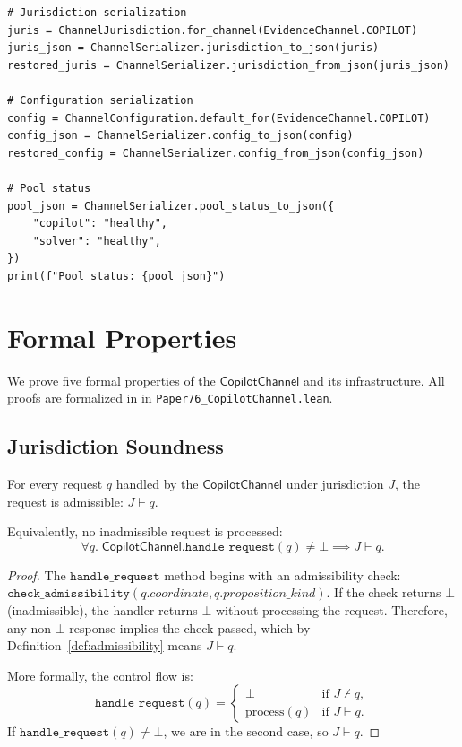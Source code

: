 \documentclass[11pt]{article}
\newcommand{\CopChan}{\mathsf{CopilotChannel}}
\newcommand{\CopHandle}{\texttt{handle\_request}}
\newcommand{\AdmCheck}{\texttt{check\_admissibility}}
\begin{document}
\begin{lstlisting}[style=jugeo-python, caption={Complete serialization round-trip demonstration.}, label=lst:serializer]
# Jurisdiction serialization
juris = ChannelJurisdiction.for_channel(EvidenceChannel.COPILOT)
juris_json = ChannelSerializer.jurisdiction_to_json(juris)
restored_juris = ChannelSerializer.jurisdiction_from_json(juris_json)

# Configuration serialization
config = ChannelConfiguration.default_for(EvidenceChannel.COPILOT)
config_json = ChannelSerializer.config_to_json(config)
restored_config = ChannelSerializer.config_from_json(config_json)

# Pool status
pool_json = ChannelSerializer.pool_status_to_json({
    "copilot": "healthy",
    "solver": "healthy",
})
print(f"Pool status: {pool_json}")
\end{lstlisting}

\section{Formal Properties}
\label{sec:formal}

We prove five formal properties of the $\CopChan$ and its
infrastructure.  All proofs are formalized in \LEAN{} in
\texttt{Paper76\_CopilotChannel.lean}.

\subsection{Jurisdiction Soundness}
\label{sec:formal:jurisdiction}

\begin{theorem}
\label{thm:jurisdiction}
For every request $q$ handled by the $\CopChan$ under jurisdiction
$J$, the request is admissible: $J \vdash q$.

Equivalently, no inadmissible request is processed:
\[
  \forall q.\; \CopChan.\CopHandle(q) \neq \bot
  \implies J \vdash q.
\]
\end{theorem}

\begin{proof}
The $\CopHandle$ method begins with an admissibility check:
$\AdmCheck(q.coordinate, q.proposition\_kind)$.  If the check
returns $\bot$ (inadmissible), the handler returns $\bot$ without
processing the request.  Therefore, any non-$\bot$ response
implies the check passed, which by Definition~\ref{def:admissibility}
means $J \vdash q$.

More formally, the control flow is:
\[
  \CopHandle(q) = \begin{cases}
    \bot & \text{if } J \nvdash q, \\
    \text{process}(q) & \text{if } J \vdash q.
  \end{cases}
\]
If $\CopHandle(q) \neq \bot$, we are in the second case, so $J \vdash q$.
\end{proof}
\end{document}
